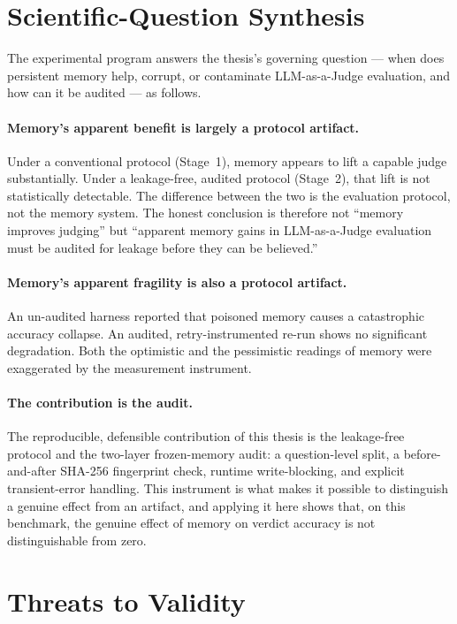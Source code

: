 \documentclass[12pt,a4paper]{report}
\begin{document}
\section{Scientific-Question Synthesis}

The experimental program answers the thesis's governing question --- when does persistent memory help, corrupt, or contaminate LLM-as-a-Judge evaluation, and how can it be audited --- as follows.

\paragraph{Memory's apparent benefit is largely a protocol artifact.} Under a conventional protocol (Stage~1), memory appears to lift a capable judge substantially. Under a leakage-free, audited protocol (Stage~2), that lift is not statistically detectable. The difference between the two is the evaluation protocol, not the memory system. The honest conclusion is therefore not ``memory improves judging'' but ``apparent memory gains in LLM-as-a-Judge evaluation must be audited for leakage before they can be believed.''

\paragraph{Memory's apparent fragility is also a protocol artifact.} An un-audited harness reported that poisoned memory causes a catastrophic accuracy collapse. An audited, retry-instrumented re-run shows no significant degradation. Both the optimistic and the pessimistic readings of memory were exaggerated by the measurement instrument.

\paragraph{The contribution is the audit.} The reproducible, defensible contribution of this thesis is the leakage-free protocol and the two-layer frozen-memory audit: a question-level split, a before-and-after SHA-256 fingerprint check, runtime write-blocking, and explicit transient-error handling. This instrument is what makes it possible to distinguish a genuine effect from an artifact, and applying it here shows that, on this benchmark, the genuine effect of memory on verdict accuracy is not distinguishable from zero.

\section{Threats to Validity}
\end{document}
